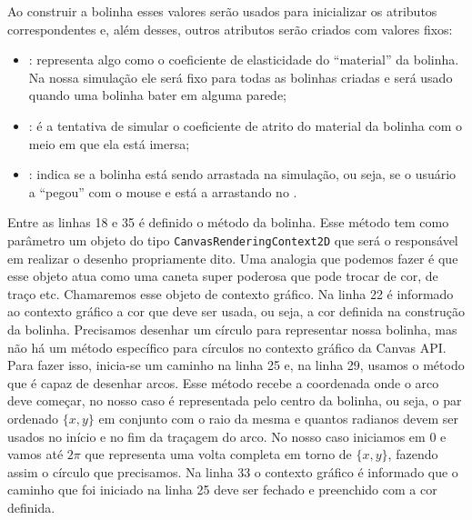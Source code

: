 Ao construir a bolinha esses valores serão usados para inicializar os atributos correspondentes e, além desses, outros atributos serão criados com valores fixos:

\begin{itemize}
    \item {}: representa algo como o coeficiente de elasticidade do ``material'' da bolinha. Na nossa simulação ele será fixo para todas as bolinhas criadas e será usado quando uma bolinha bater em alguma parede;
    \item {}: é a tentativa de simular o coeficiente de atrito do material da bolinha com o meio em que ela está imersa;
    \item {}: indica se a bolinha está sendo arrastada na simulação, ou seja, se o usuário a ``pegou'' com o mouse e está a arrastando no .
\end{itemize}

Entre as linhas 18 e 35 é definido o método  da bolinha. Esse método tem como parâmetro um objeto do tipo \texttt{CanvasRenderingContext2D} que será o responsável em realizar o desenho propriamente dito. Uma analogia que podemos fazer é que esse objeto atua como uma caneta super poderosa que pode trocar de cor, de traço etc. Chamaremos esse objeto de contexto gráfico. Na linha 22 é informado ao contexto gráfico a cor que deve ser usada, ou seja, a cor definida na construção da bolinha. Precisamos desenhar um círculo para representar nossa bolinha, mas não há um método específico para círculos no contexto gráfico da Canvas API. Para fazer isso, inicia-se um caminho na linha 25 e, na linha 29, usamos o método  que é capaz de desenhar arcos. Esse método recebe a coordenada onde o arco deve começar, no nosso caso é  representada pelo centro da bolinha, ou seja, o par ordenado $\{x, y\}$ em conjunto com o raio da mesma e quantos radianos devem ser usados no início e no fim da traçagem do arco. No nosso caso iniciamos em 0 e vamos até $2\pi$ que representa uma volta completa em torno de $\{x, y\}$, fazendo assim o círculo que precisamos. Na linha 33 o contexto gráfico é informado que o caminho que foi iniciado na linha 25 deve ser fechado e preenchido com a cor definida.

